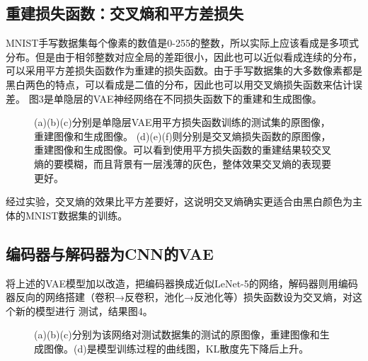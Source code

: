 \documentclass[UTF8]{ctexart}
\begin{document}
\subsection{重建损失函数：交叉熵和平方差损失}
MNIST手写数据集每个像素的数值是0-255的整数，所以实际上应该看成是多项式分布。但是由于相邻整数对应全局的差距很小，因此也可以近似看成连续的分布，
可以采用平方差损失函数作为重建的损失函数。由于手写数据集的大多数像素都是黑白两色的特点，可以看成是二值的分布，因此也可以用交叉熵损失函数来估计误差。
图3是单隐层的VAE神经网络在不同损失函数下的重建和生成图像。
\begin{figure}[ht]
  \centering
  \quad
  \quad
  \quad
  \quad
  \quad
  \caption{(a)(b)(c)分别是单隐层VAE用平方损失函数训练的测试集的原图像，重建图像和生成图像。
  (d)(e)(f)则分别是交叉熵损失函数的原图像，重建图像和生成图像。可以看到使用平方损失函数的重建结果较交叉熵的要模糊，而且背景有一层浅薄的灰色，整体效果交叉熵的表现要更好。}
\end{figure}

经过实验，交叉熵的效果比平方差要好，这说明交叉熵确实更适合由黑白颜色为主体的MNIST数据集的训练。
\subsection{编码器与解码器为CNN的VAE}
将上述的VAE模型加以改造，把编码器换成近似LeNet-5的网络，解码器则用编码器反向的网络搭建（卷积→反卷积，池化→反池化等）损失函数设为交叉熵，对这个新的模型进行
测试，结果图4。
\begin{figure}[ht]
  \centering
  \quad
  \quad
  \centering
  \caption{(a)(b)(c)分别为该网络对测试数据集的测试的原图像，重建图像和生成图像。(d)是模型训练过程的曲线图，KL散度先下降后上升。}
\end{figure}
\end{document}
